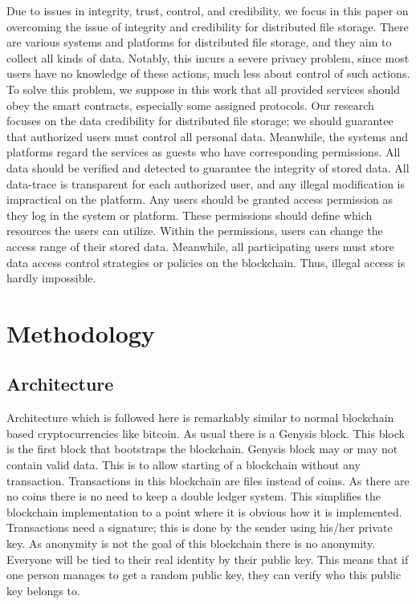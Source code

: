 \documentclass[conference]{IEEEtran}
\begin{document}
Due to issues in integrity, trust, control, and credibility, we focus in this paper on overcoming the issue of integrity and credibility for distributed file storage. There are various systems and platforms for distributed file storage, and they aim to collect all kinds of data. Notably, this incurs a severe privacy problem, since most users have no knowledge of these actions, much less about control of such actions. To solve this problem, we suppose in this work that all provided services should obey the smart contracts, especially some assigned protocols. Our research focuses on the data credibility for distributed file storage; we should guarantee that authorized users must control all personal data. Meanwhile, the systems and platforms regard the services as guests who have corresponding permissions. All data should be verified and detected to guarantee the integrity of stored data. All data-trace is transparent for each authorized user, and any illegal modification is impractical on the platform. Any users should be granted access permission as they log in the system or platform. These permissions should define which resources the users can utilize. Within the permissions, users can change the access range of their stored data. Meanwhile, all participating users must store data access control strategies or policies on the blockchain. Thus, illegal access is hardly impossible. 

\section{Methodology}
\subsection{Architecture}
Architecture which is followed here is remarkably similar to normal blockchain based cryptocurrencies like bitcoin\cite{b6}. As usual there is a Genysis block. This block is the first block that bootstraps the blockchain. Genysis block may or may not contain valid data. This is to allow starting of a blockchain without any transaction. Transactions in this blockchain are files instead of coins. As there are no coins there is no need to keep a double ledger system. This simplifies the blockchain implementation to a point where it is obvious how it is implemented. Transactions need a signature; this is done by the sender using his/her private key. As anonymity is not the goal of this blockchain there is no anonymity. Everyone will be tied to their real identity by their public key. This means that if one person manages to get a random public key, they can verify who this public key belongs to.  
\end{document}
